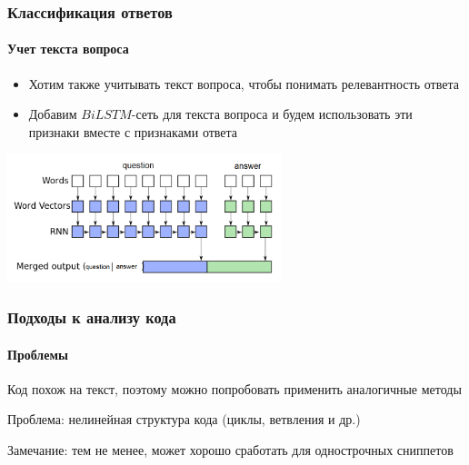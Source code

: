 \documentclass[10pt]{beamer}
\begin{document}

\begin{frame}
\frametitle{Классификация ответов}
\framesubtitle{Учет текста вопроса}

\begin{itemize}
	\item Хотим также учитывать текст вопроса, чтобы понимать релевантность ответа
	\item Добавим $BiLSTM$-сеть для текста вопроса и будем использовать эти признаки вместе с признаками ответа 
\end{itemize}

\begin{center}
	\includegraphics[width=0.6\textwidth]{images/qa.png}
\end{center}

\end{frame}


\begin{frame}
\frametitle{Подходы к анализу кода}
\framesubtitle{Проблемы}

Код похож на текст, поэтому можно попробовать применить аналогичные методы

Проблема: нелинейная структура кода (циклы, ветвления и др.)

\medskip

\footnotesize{Замечание: тем не менее, может хорошо сработать для однострочных сниппетов}

\end{frame}

\end{document}
